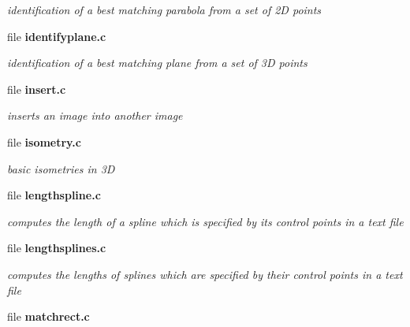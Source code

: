 \begin{DoxyCompactItemize}
\begin{DoxyCompactList}\small\item\em identification of a best matching parabola from a set of 2D points \item\end{DoxyCompactList}

\item 
file {\bf identifyplane.c}


\begin{DoxyCompactList}\small\item\em identification of a best matching plane from a set of 3D points \item\end{DoxyCompactList}

\item 
file {\bf insert.c}


\begin{DoxyCompactList}\small\item\em inserts an image into another image \item\end{DoxyCompactList}

\item 
file {\bf isometry.c}


\begin{DoxyCompactList}\small\item\em basic isometries in 3D \item\end{DoxyCompactList}

\item 
file {\bf lengthspline.c}


\begin{DoxyCompactList}\small\item\em computes the length of a spline which is specified by its control points in a text file \item\end{DoxyCompactList}

\item 
file {\bf lengthsplines.c}


\begin{DoxyCompactList}\small\item\em computes the lengths of splines which are specified by their control points in a text file \item\end{DoxyCompactList}

\item 
file {\bf matchrect.c}



\end{DoxyCompactItemize}
